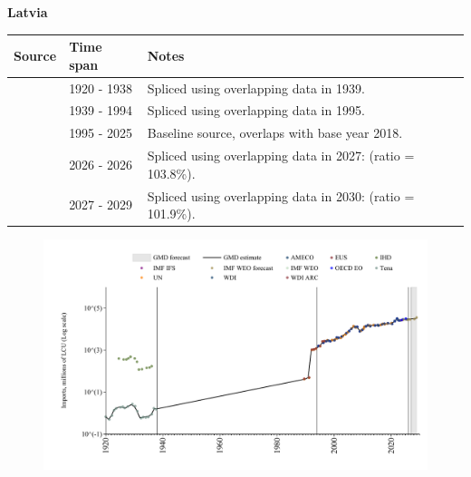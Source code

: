 \documentclass[12pt,a4paper,landscape]{article}
\begin{document}
\begin{adjustbox}{max totalsize={\paperwidth}{\paperheight},center}
\begin{minipage}[t][\textheight][t]{\textwidth}
\vspace*{0.5cm}
{}
\begin{center}
{\Large\bfseries Latvia}
\end{center}
\vspace{0.5cm}
\begin{table}[H]
\centering
\small
\begin{tabular}{|l|l|l|}
\hline
\textbf{Source} & \textbf{Time span} & \textbf{Notes} \\
\hline
\rowcolor{white}\cite{Tena}& 1920 - 1938 &Spliced using overlapping data in 1939.\\
\rowcolor{lightgray}\cite{AMECO}& 1939 - 1994 &Spliced using overlapping data in 1995.\\
\rowcolor{white}\cite{OECD_EO}& 1995 - 2025 &Baseline source, overlaps with base year 2018.\\
\rowcolor{lightgray}\cite{AMECO}& 2026 - 2026 &Spliced using overlapping data in 2027: (ratio = 103.8\%).\\
\rowcolor{white}\cite{IMF_WEO_forecast}& 2027 - 2029 &Spliced using overlapping data in 2030: (ratio = 101.9\%).\\
\hline
\end{tabular}
\end{table}
\begin{figure}[H]
\centering
\includegraphics[width=\textwidth,height=0.6\textheight,keepaspectratio]{graphs/LVA_imports.pdf}
\end{figure}
\end{minipage}
\end{adjustbox}
\end{document}
